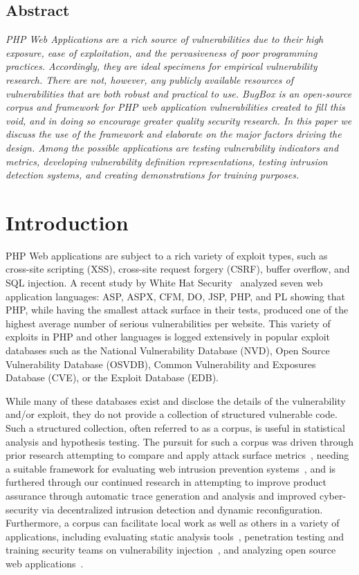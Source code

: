\documentclass[letterpaper,twocolumn,10pt]{article}
\begin{document}
\subsection*{Abstract}
\textit{
PHP Web Applications are a rich source of vulnerabilities due to their high exposure, ease of exploitation, and the pervasiveness of poor programming practices. Accordingly, they are ideal specimens for empirical vulnerability research. There are not, however, any publicly available resources of vulnerabilities that are both robust and practical to use. BugBox is an open-source corpus and framework for PHP web application vulnerabilities created to fill this void, and in doing so encourage greater quality security research. In this paper we discuss the use of the framework and elaborate on the major factors driving the design. Among the possible applications are testing vulnerability indicators and metrics, developing vulnerability definition representations, testing intrusion detection systems, and creating demonstrations for training purposes.  
}

\section{Introduction}
PHP Web applications are subject to a rich variety of exploit types, such as cross-site scripting (XSS), cross-site request forgery (CSRF), buffer overflow, and SQL injection.  A recent study by White Hat Security~\cite{WhiteHat:2010:Online} analyzed seven web application languages: ASP, ASPX, CFM, DO, JSP, PHP, and PL showing that PHP, while having the smallest attack surface in their tests, produced one of the highest average number of serious vulnerabilities per website.  This variety of exploits in PHP and other languages is logged extensively in popular exploit databases such as the National Vulnerability Database (NVD), Open Source Vulnerability Database (OSVDB), Common Vulnerability and Exposures Database (CVE), or the Exploit Database (EDB).\par

While many of these databases exist and disclose the details of the vulnerability and/or exploit, they do not provide a collection of structured vulnerable code.  Such a structured collection, often referred to as a corpus, is useful in statistical analysis and hypothesis testing.  The pursuit for such a corpus was driven through prior research attempting to compare and apply attack surface metrics~\cite{Stuckman:2012:CAA:2372225.2372229}, needing a suitable framework for evaluating web intrusion prevention systems~\cite{Stuckman:2011:TEW:2195220.2195671}, and is furthered through our continued research in attempting to improve product assurance through automatic trace generation and analysis and improved cyber-security via decentralized intrusion detection and dynamic reconfiguration.  Furthermore, a corpus can facilitate local work as well as others in a variety of applications, including evaluating static analysis tools~\cite{Zitser:2004:TSA:1041685.1029911}, penetration testing and training security teams on vulnerability injection~\cite{4725309}, and analyzing open source web applications~\cite{DBLP:journals/ese/HuynhM10}.  
\end{document}
